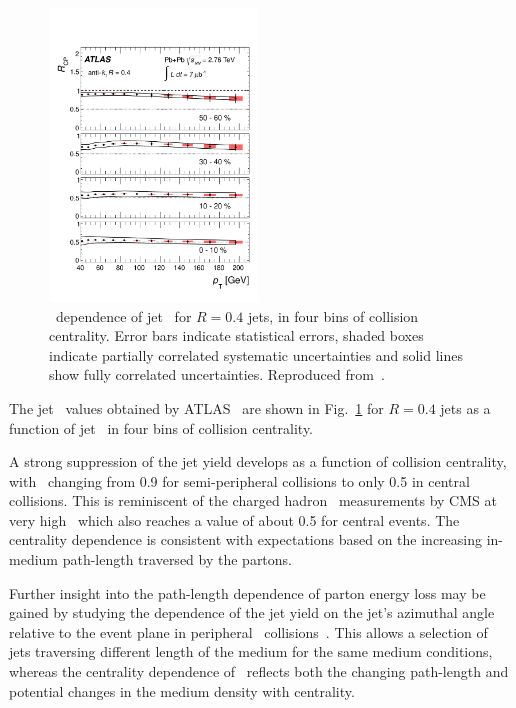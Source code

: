 \begin{figure}[!th]
\begin{center}
\includegraphics[width=0.49\textwidth]{jetfigures/ATLAS_jetRCP_04.pdf}
\caption{
\pT\ dependence of jet \Rcp\ for  $R=0.4$ jets,
in four bins of collision centrality. Error bars indicate
statistical errors,  shaded boxes indicate partially
correlated systematic uncertainties and
solid lines show fully correlated uncertainties. Reproduced from~\cite{Aad:2012is}.}
\label{fig:GR:rcprfour}
\end{center}
\end{figure}
The jet \Rcp\ values obtained by ATLAS~\cite{Aad:2012is} are shown in Fig.~\ref{fig:GR:rcprfour}
for $R=0.4$ jets as a function of jet \pT\ in four bins of collision centrality.

A strong suppression of the jet yield develops as a function
of collision centrality, with \Rcp\ changing from 0.9 for semi-peripheral
collisions to only 0.5 in central collisions.  This is reminiscent
of the charged hadron \Raa\ measurements by CMS at very high \pT\, which
also reaches a value of about 0.5 for central events.
The centrality dependence is consistent with expectations based on the increasing
in-medium path-length traversed by the partons.

Further insight into the path-length dependence of parton energy
loss may be gained by studying the dependence of the jet yield
on the jet's azimuthal angle relative to the event plane
in peripheral \PbPb\ collisions~\cite{Aad:2013sla}. This allows a selection of jets
traversing different length of the medium for the same medium
conditions, whereas the centrality dependence of \Rcp\ reflects
both the changing path-length and potential changes in the medium
density with centrality.

